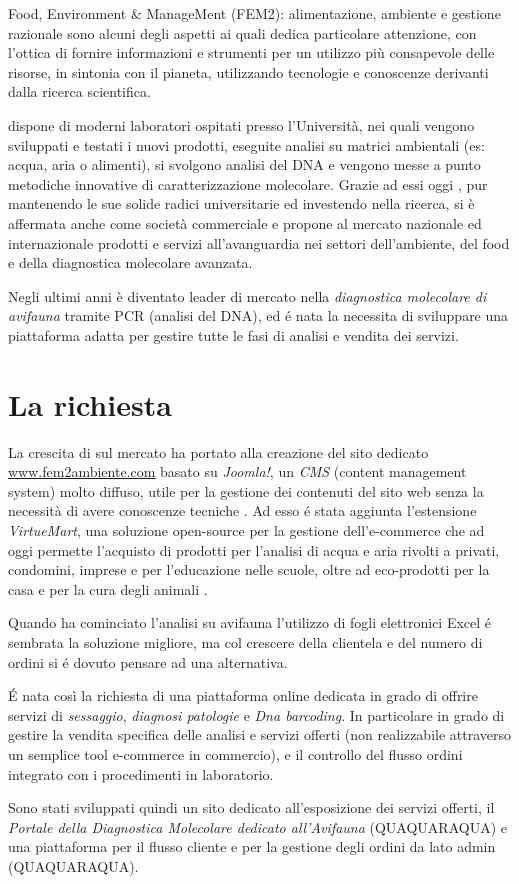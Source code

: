 Food, Environment \& ManageMent (FEM2): alimentazione, ambiente e gestione razionale sono alcuni degli aspetti ai quali {\fem} dedica particolare attenzione, con l'ottica di fornire informazioni e strumenti per un utilizzo più consapevole delle risorse, in sintonia con il pianeta, utilizzando tecnologie e conoscenze derivanti dalla ricerca scientifica.

{\fem} dispone di moderni laboratori ospitati presso l’Università, nei quali vengono sviluppati e testati i nuovi prodotti, eseguite analisi su matrici ambientali (es: acqua, aria o alimenti), si svolgono analisi del DNA e vengono messe a punto metodiche innovative di caratterizzazione molecolare. Grazie ad essi oggi {\fem}, pur mantenendo le sue solide radici universitarie ed investendo nella ricerca, si è affermata anche come società commerciale e propone al mercato nazionale ed internazionale prodotti e servizi all'avanguardia nei settori dell'ambiente, del food e della diagnostica molecolare avanzata.

Negli ultimi anni è diventato leader di mercato nella \emph{diagnostica molecolare di avifauna} tramite PCR (analisi del DNA), ed é nata la necessita di sviluppare una piattaforma adatta per gestire tutte le fasi di analisi e vendita dei servizi.

\section{La richiesta}
\label{sec:richiesta}

La crescita di {\fem} sul mercato ha portato alla creazione del sito dedicato \url{www.fem2ambiente.com} basato su \emph{Joomla!}, un \emph{CMS} (content management system) molto diffuso, utile per la gestione dei contenuti del sito web senza la necessità di avere conoscenze tecniche \cite{joomla}. Ad esso é stata aggiunta l'estensione \emph{VirtueMart}, una soluzione open-source per la gestione dell'e-commerce che ad oggi permette l'acquisto di prodotti per l'analisi di acqua e aria rivolti a privati, condomini, imprese e per l'educazione nelle scuole, oltre ad eco-prodotti per la casa e per la cura degli animali \cite{virtuemart}.

Quando {\fem} ha cominciato l'analisi su avifauna l'utilizzo di fogli elettronici Excel é sembrata la soluzione migliore, ma col crescere della clientela e del numero di ordini si é dovuto pensare ad una alternativa. 

É nata così la richiesta di una piattaforma online dedicata in grado di offrire servizi di \emph{sessaggio}, \emph{diagnosi patologie} e \emph{Dna barcoding}. In particolare in grado di gestire la vendita specifica delle analisi e servizi offerti (non realizzabile attraverso un semplice tool e-commerce in commercio), e il controllo del flusso ordini integrato con i procedimenti in laboratorio.

Sono stati sviluppati quindi un sito dedicato all'esposizione dei servizi offerti, il  \emph{Portale della Diagnostica Molecolare dedicato all'Avifauna} (QUAQUARAQUA) e una piattaforma per il flusso cliente e per la gestione degli ordini da lato admin (QUAQUARAQUA).
